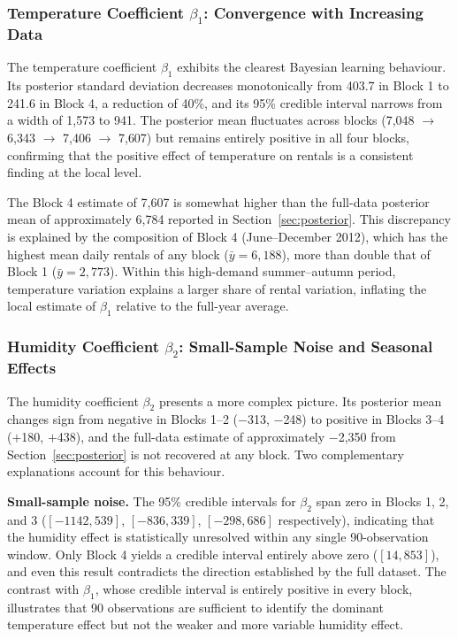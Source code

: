\subsubsection{Temperature Coefficient $\beta_1$: Convergence with Increasing Data}

The temperature coefficient $\beta_1$ exhibits the clearest Bayesian learning
behaviour. Its posterior standard deviation decreases monotonically from 403.7
in Block 1 to 241.6 in Block 4, a reduction of 40\%, and its 95\% credible
interval narrows from a width of 1{,}573 to 941. The posterior mean fluctuates
across blocks (7{,}048 $\to$ 6{,}343 $\to$ 7{,}406 $\to$ 7{,}607) but remains
entirely positive in all four blocks, confirming that the positive effect of
temperature on rentals is a consistent finding at the local level.

The Block 4 estimate of 7{,}607 is somewhat higher than the full-data posterior
mean of approximately 6{,}784 reported in Section~\ref{sec:posterior}. This
discrepancy is explained by the composition of Block 4 (June--December 2012),
which has the highest mean daily rentals of any block ($\bar{y} = 6{,}188$),
more than double that of Block 1 ($\bar{y} = 2{,}773$). Within this high-demand
summer--autumn period, temperature variation explains a larger share of rental
variation, inflating the local estimate of $\beta_1$ relative to the full-year
average.

\subsubsection{Humidity Coefficient $\beta_2$: Small-Sample Noise and Seasonal Effects}

The humidity coefficient $\beta_2$ presents a more complex picture. Its posterior
mean changes sign from negative in Blocks 1--2 ($-$313, $-$248) to positive in
Blocks 3--4 ($+$180, $+$438), and the full-data estimate of approximately
$-$2{,}350 from Section~\ref{sec:posterior} is not recovered at any block.
Two complementary explanations account for this behaviour.

\textbf{Small-sample noise.} The 95\% credible intervals for $\beta_2$ span zero
in Blocks 1, 2, and 3 ($[-1142, 539]$, $[-836, 339]$, $[-298, 686]$ respectively),
indicating that the humidity effect is statistically unresolved within any single
90-observation window. Only Block 4 yields a credible interval entirely above
zero ($[14, 853]$), and even this result contradicts the direction established
by the full dataset. The contrast with $\beta_1$, whose credible interval is
entirely positive in every block, illustrates that 90 observations are sufficient
to identify the dominant temperature effect but not the weaker and more
variable humidity effect.

